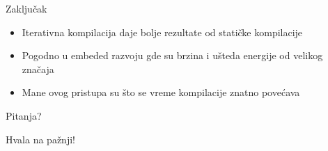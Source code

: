 \documentclass[10pt]{beamer}
\begin{document}
\begin{frame}{Zaključak}

  \begin{itemize}[<+- | @alert->]
    \item Iterativna kompilacija daje bolje rezultate od statičke kompilacije
    \item Pogodno u embeded razvoju gde su brzina i ušteda energije od velikog značaja
    \item Mane ovog pristupa su što se vreme kompilacije znatno povećava
  \end{itemize}

\end{frame}

\begin{frame}[standout]
  Pitanja?
\end{frame}
\begin{frame}[standout]
  Hvala na pažnji!
\end{frame}
\end{document}
